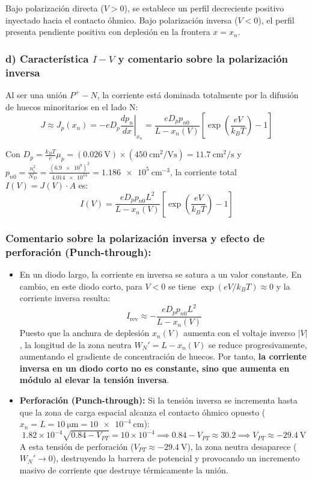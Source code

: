 \begin{problema}
Bajo polarización directa ($V > 0$), se establece un perfil decreciente positivo inyectado hacia el contacto óhmico. Bajo polarización inversa ($V < 0$), el perfil presenta pendiente positiva con deplesión en la frontera $x = x_n$.

\subsubsection*{d) Característica $I-V$ y comentario sobre la polarización inversa}

Al ser una unión $P^+-N$, la corriente está dominada totalmente por la difusión de huecos minoritarios en el lado N:
\[
J \approx J_p(x_n) = -e D_p \left. \frac{dp_n}{dx} \right|_{x_n} = \frac{e D_p p_{n0}}{L - x_n(V)} \left[ \exp\left(\frac{e V}{k_B T}\right) - 1 \right]
\]

Con $D_p = \frac{k_B T}{e} \mu_p = (\SI{0.026}{\V}) \times (\SI{450}{\cm^2/\V\second}) = \SI{11.7}{\cm^2/\second}$ y $p_{n0} = \frac{n_i^2}{N_D} = \frac{(\num{6.9e9})^2}{\num{4.014e14}} = \SI{1.186e5}{\cm^{-3}}$, la corriente total $I(V) = J(V) \cdot A$ es:
\[
I(V) = \frac{e D_p p_{n0} L^2}{L - x_n(V)} \left[ \exp\left(\frac{e V}{k_B T}\right) - 1 \right]
\]

\subsubsection*{Comentario sobre la polarización inversa y efecto de perforación (Punch-through):}
\begin{itemize}
    \item En un diodo largo, la corriente en inversa se satura a un valor constante. En cambio, en este diodo corto, para $V < 0$ se tiene $\exp(e V / k_B T) \approx 0$ y la corriente inversa resulta:
    \[
    I_{\text{rev}} \approx -\frac{e D_p p_{n0} L^2}{L - x_n(V)}
    \]
    Puesto que la anchura de deplesión $x_n(V)$ aumenta con el voltaje inverso $|V|$, la longitud de la zona neutra $W_N' = L - x_n(V)$ se reduce progresivamente, aumentando el gradiente de concentración de huecos. Por tanto, \textbf{la corriente inversa en un diodo corto no es constante, sino que aumenta en módulo al elevar la tensión inversa}.
    
    \item \textbf{Perforación (Punch-through):} Si la tensión inversa se incrementa hasta que la zona de carga espacial alcanza el contacto óhmico opuesto ($x_n = L = \SI{10}{\um} = \SI{10e-4}{\cm}$):
    \[
    1.82 \times 10^{-4} \sqrt{0.84 - V_{PT}} = 10 \times 10^{-4} \implies 0.84 - V_{PT} \approx 30.2 \implies V_{PT} \approx \SI{-29.4}{\V}
    \]
    A esta tensión de perforación ($V_{PT} \approx \SI{-29.4}{\V}$), la zona neutra desaparece ($W_N' \to 0$), destruyendo la barrera de potencial y provocando un incremento masivo de corriente que destruye térmicamente la unión.
\end{itemize}


\end{problema}
